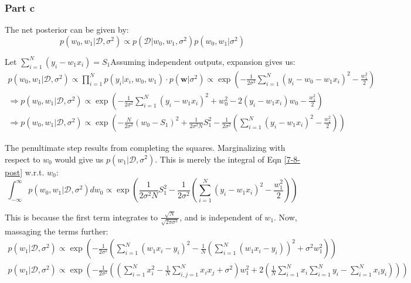 \documentclass{article}
\newcommand{\vct}[1]{\mathbf{#1}}
\begin{document}
\subsubsection*{Part c}
\begin{flushleft}
The net posterior can be given by:
\begin{equation}
p(w_{0}, w_{1} | \mathcal{D}, \sigma^{2}) \propto p(\mathcal{D} | w_{0}, w_{1}, \sigma^{2}) p(w_{0}, w_{1} | \sigma^{2})
\end{equation}

Let \(\displaystyle \sum_{i=1}^{N}(y_{i} - w_{1}x_{i}) = S_{1}\)Assuming independent outputs, expansion gives us:
\begin{gather}
p(w_{0}, w_{1} | \mathcal{D}, \sigma^{2}) \propto \prod_{i=1}^{N} p(y_{i}| x_{i}, w_{0}, w_{1}) \cdot p(\vct{w} | \sigma^{2}) \propto \exp\left(-\frac{1}{2\sigma^{2}}\sum_{i=1}^{N}(y_{i} - w_{0} - w_{1}x_{i})^{2} - \frac{w_{1}^{2}}{2}\right) \\
\Rightarrow p(w_{0}, w_{1} | \mathcal{D}, \sigma^{2}) \propto \exp\left(-\frac{1}{2\sigma^{2}}\sum_{i=1}^{N}(y_{i} - w_{1}x_{i})^{2} + w_{0}^{2} - 2(y_{i} - w_{1}x_{i})w_{0} - \frac{w_{1}^{2}}{2}\right)\\
\label{7-8-post}
\Rightarrow p(w_{0}, w_{1} | \mathcal{D}, \sigma^{2}) \propto \exp\left(-\frac{N}{2\sigma^{2}} (w_{0} - S_{1})^{2} + \frac{1}{2\sigma^{2}N}S_{1}^{2} - \frac{1}{2\sigma^{2}}\left(\sum_{i=1}^{N}(y_{i} - w_{1}x_{i})^{2} - \frac{w_{1}^{2}}{2}\right)\right)
\end{gather}

The penultimate step results from completing the squares. Marginalizing with respect to \(w_{0}\) would give us \(p(w_{1} | \mathcal{D}, \sigma^{2})\). This is merely the integral of Eqn \ref{7-8-post} w.r.t. \(w_{0}\):
\begin{equation}
\int_{-\infty}^{\infty} p(w_{0}, w_{1} | \mathcal{D}, \sigma^{2}) dw_{0} \propto \exp\left(\frac{1}{2\sigma^{2}N}S_{1}^{2} - \frac{1}{2\sigma^{2}}\left(\sum_{i=1}^{N}(y_{i} - w_{1}x_{i})^{2} - \frac{w_{1}^{2}}{2}\right)\right)
\end{equation}

This is because the first term integrates to \(\frac{\sqrt{N}}{\sqrt{2\pi\sigma^2}}\), and is independent of \(w_{1}\). Now, massaging the terms further:
\begin{gather}
p(w_{1} | \mathcal{D}, \sigma^{2}) \propto \exp\left(-\frac{1}{2\sigma^{2}}\left(\sum_{i=1}^{N}(w_{1}x_{i} - y_{i})^{2} - \frac{1}{N}\left(\sum_{i=1}^{N}(w_{1}x_{i} - y_{i})\right)^{2} + \sigma^{2}w_{1}^{2}\right)\right)\\
p(w_{1} | \mathcal{D}, \sigma^{2}) \propto \exp\left(-\frac{1}{2\sigma^{2}}\left(\left(\sum_{i=1}^{N}x_{i}^{2} - \frac{1}{N}\sum_{i,j=1}^{N}x_{i}x_{j} + \sigma^{2}\right)w_{1}^{2} + 2\left(\frac{1}{N}\sum_{i=1}^{N}x_{i}\sum_{i=1}^{N}y_{i} - \sum_{i=1}^{N}x_{i}y_{i}\right)\right)\right)
\end{gather}


\end{flushleft}
\end{document}
